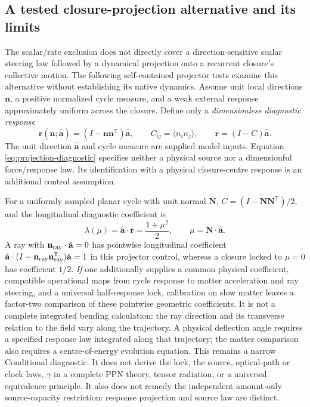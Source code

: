 \documentclass[11pt]{article}
\theoremstyle{plain}
\theoremstyle{remark}
\begin{document}
\subsection{A tested closure-projection alternative and its limits}
\label{sec:closure-projection}
The scalar/rate exclusion does not directly cover a direction-sensitive
scalar steering law followed by a dynamical projection onto a recurrent
closure's collective motion.  The following self-contained projector tests
examine this alternative without establishing its native dynamics.  Assume
unit local directions $\mathbf n$, a positive normalized cycle measure,
and a weak external response approximately uniform across the closure.
Define only a \emph{dimensionless diagnostic response}
\begin{equation}
 \mathbf r(\mathbf n;\hat{\mathbf a})
 =(I-\mathbf n\mathbf n^{\mathsf T})\hat{\mathbf a},
 \qquad
 C_{ij}=\langle n_i n_j\rangle,\qquad
 \overline{\mathbf r}=(I-C)\hat{\mathbf a}.
 \label{eq:projection-diagnostic}
\end{equation}
The unit direction $\hat{\mathbf a}$ and cycle measure are supplied model
inputs.  Equation \eqref{eq:projection-diagnostic} specifies neither a
physical source nor a dimensionful force/response law.  Its identification
with a physical closure-centre response is an additional control assumption.

For a uniformly sampled planar cycle with unit normal $\mathbf N$,
$C=(I-\mathbf N\mathbf N^{\mathsf T})/2$, and the longitudinal diagnostic
coefficient is
\begin{equation}
 \lambda(\mu)
 =\hat{\mathbf a}\cdot\overline{\mathbf r}
 =\frac{1+\mu^2}{2},
 \qquad \mu=\mathbf N\cdot\hat{\mathbf a}.
 \label{eq:projection-planar-coefficient}
\end{equation}
A ray with $\mathbf n_{\rm ray}\cdot\hat{\mathbf a}=0$ has pointwise
longitudinal coefficient
$\hat{\mathbf a}\cdot(I-\mathbf n_{\rm ray}\mathbf n_{\rm ray}^{\mathsf T})
\hat{\mathbf a}=1$ in this projector control, whereas a closure locked
to $\mu=0$ has coefficient $1/2$.
\emph{If} one additionally supplies a common physical coefficient,
compatible operational maps from cycle response to matter acceleration
and ray steering, and a universal half-response lock, calibration on slow
matter leaves a factor-two comparison of these pointwise geometric
coefficients.  It is not a complete integrated bending calculation:
the ray direction and its transverse relation to the field vary along
the trajectory.  A physical deflection angle requires a specified
response law integrated along that trajectory; the matter comparison
also requires a centre-of-energy evolution equation.  This remains a
narrow Conditional diagnostic.
It does not derive the lock, the source, optical-path or clock laws,
$\gamma$ in a complete PPN theory, tensor radiation, or a universal
equivalence principle.  It also does not remedy the independent amount-only
source-capacity restriction: response projection and source law are distinct.
\end{document}
